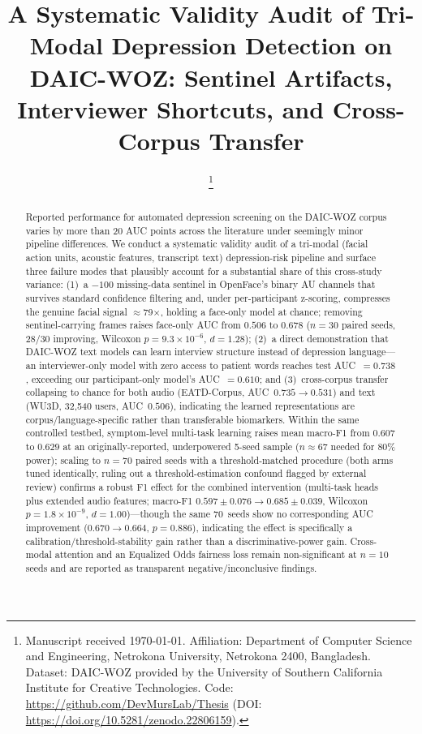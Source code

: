 \documentclass[journal]{IEEEtran}
\title{A Systematic Validity Audit of Tri-Modal Depression Detection on
DAIC-WOZ: Sentinel Artifacts, Interviewer Shortcuts, and Cross-Corpus
Transfer}
\author{\thanks{Manuscript received \today.
Affiliation: Department of Computer Science and Engineering,
Netrokona University, Netrokona 2400, Bangladesh.
Dataset: DAIC-WOZ provided by the University of Southern California
Institute for Creative Technologies.
Code: \url{https://github.com/DevMursLab/Thesis}
(DOI: \url{https://doi.org/10.5281/zenodo.22806159}).}%
}
\begin{document}
\maketitle

\begin{abstract}
Reported performance for automated depression screening on the
DAIC-WOZ corpus varies by more than 20 AUC points across the
literature under seemingly minor pipeline differences. We conduct a
systematic validity audit of a tri-modal (facial action units,
acoustic features, transcript text) depression-risk pipeline and
surface three failure modes that plausibly account for a substantial
share of this cross-study variance: (1)~a $-100$ missing-data
sentinel in OpenFace's binary AU channels that survives standard
confidence filtering and, under per-participant z-scoring, compresses
the genuine facial signal $\approx$79$\times$, holding a face-only
model at chance; removing sentinel-carrying frames raises face-only
AUC from $0.506$ to $0.678$ ($n{=}30$ paired seeds, 28/30 improving,
Wilcoxon $p{=}9.3{\times}10^{-6}$, $d{=}1.28$); (2)~a direct
demonstration that DAIC-WOZ text models can learn interview structure
instead of depression language---an interviewer-only model with zero
access to patient words reaches test AUC~$=0.738$, exceeding our
participant-only model's AUC~$=0.610$; and (3)~cross-corpus transfer
collapsing to chance for both audio (EATD-Corpus, AUC~$0.735\to0.531$)
and text (WU3D, 32,540 users, AUC~$0.506$), indicating the learned
representations are corpus/language-specific rather than transferable
biomarkers. Within the same controlled testbed, symptom-level
multi-task learning raises mean macro-F1 from $0.607$ to $0.629$ at
an originally-reported, underpowered 5-seed sample ($n{\approx}67$
needed for 80\% power); scaling to $n{=}70$ paired seeds with a
threshold-matched procedure (both arms tuned identically, ruling out
a threshold-estimation confound flagged by external review) confirms
a robust F1 effect for the combined intervention (multi-task heads
plus extended audio features; macro-F1
$0.597\pm0.076\to0.685\pm0.039$, Wilcoxon $p{=}1.8{\times}10^{-9}$,
$d{=}1.00$)---though the same 70~seeds show no corresponding AUC
improvement ($0.670\to0.664$, $p{=}0.886$), indicating the effect is
specifically a calibration/threshold-stability gain rather than a
discriminative-power gain. Cross-modal attention and
an Equalized Odds fairness loss remain non-significant at $n{=}10$
seeds and are reported as transparent negative/inconclusive findings.

\end{abstract}
\end{document}
